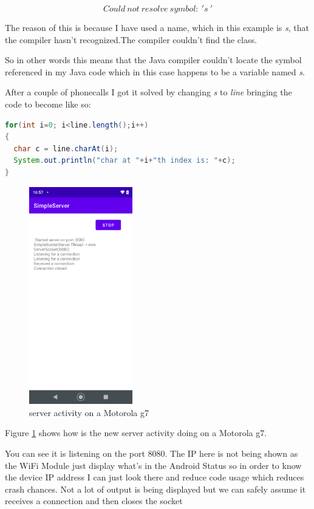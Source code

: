 \documentclass[a4paper,12pt]{book}
\begin{document}
\[ Could \ not \ resolve \ symbol: \ 's\ ' \]


\newline The reason of this is because I have used a name, which in this example is \emph{s}, that the compiler hasn't recognized.The compiler couldn't find the class.

So in other words this means that the Java compiler couldn't locate the symbol referenced in my Java code which in this case happens to be a variable named \emph{s}.

After a couple of phonecalls I got it solved by changing \emph{s} to \emph{line} bringing the code to become like so:

\begin{lstlisting}[language=java]
for(int i=0; i<line.length();i++)
{
  char c = line.charAt(i);
  System.out.println("char at "+i+"th index is: "+c);
}
\end{lstlisting}

\clearpage


\begin{figure}
\centering
\includegraphics[width=4.5cm]{./9-May/server_g7.PNG}
\caption{server activity on a Motorola g7}\label{fig:server-activity-g7}
\end{figure}
Figure \ref{fig:server-activity-g7} shows how is the new server activity doing on a Motorola g7.

You can see it is listening on the port 8080. The IP here is not being shown as the WiFi Module just display what's in the Android Status so in order to know the device IP address I can just look there and reduce code usage which reduces crash chances. Not a lot of output is being displayed but we can safely assume it receives a connection and then closes the socket
\end{document}
